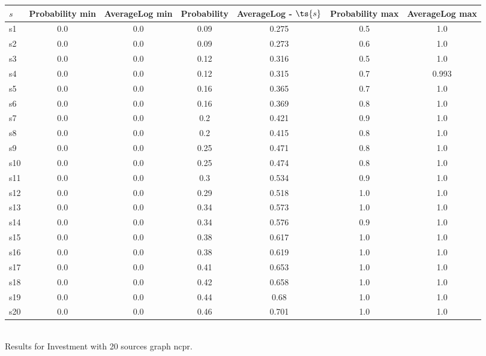 \documentclass{article}
\begin{document}
\noindent\begin{tabular}{|l|c|c|c|c|c|c|}
\hline
$s$& Probability min & AverageLog min & Probability & AverageLog - $\ts{s}$ & Probability max & AverageLog max\\
\hline
s1 &0.0 & 0.0 & 0.09 & 0.275 & 0.5 & 1.0\\
\hline
s2 &0.0 & 0.0 & 0.09 & 0.273 & 0.6 & 1.0\\
\hline
s3 &0.0 & 0.0 & 0.12 & 0.316 & 0.5 & 1.0\\
\hline
s4 &0.0 & 0.0 & 0.12 & 0.315 & 0.7 & 0.993\\
\hline
s5 &0.0 & 0.0 & 0.16 & 0.365 & 0.7 & 1.0\\
\hline
s6 &0.0 & 0.0 & 0.16 & 0.369 & 0.8 & 1.0\\
\hline
s7 &0.0 & 0.0 & 0.2 & 0.421 & 0.9 & 1.0\\
\hline
s8 &0.0 & 0.0 & 0.2 & 0.415 & 0.8 & 1.0\\
\hline
s9 &0.0 & 0.0 & 0.25 & 0.471 & 0.8 & 1.0\\
\hline
s10 &0.0 & 0.0 & 0.25 & 0.474 & 0.8 & 1.0\\
\hline
s11 &0.0 & 0.0 & 0.3 & 0.534 & 0.9 & 1.0\\
\hline
s12 &0.0 & 0.0 & 0.29 & 0.518 & 1.0 & 1.0\\
\hline
s13 &0.0 & 0.0 & 0.34 & 0.573 & 1.0 & 1.0\\
\hline
s14 &0.0 & 0.0 & 0.34 & 0.576 & 0.9 & 1.0\\
\hline
s15 &0.0 & 0.0 & 0.38 & 0.617 & 1.0 & 1.0\\
\hline
s16 &0.0 & 0.0 & 0.38 & 0.619 & 1.0 & 1.0\\
\hline
s17 &0.0 & 0.0 & 0.41 & 0.653 & 1.0 & 1.0\\
\hline
s18 &0.0 & 0.0 & 0.42 & 0.658 & 1.0 & 1.0\\
\hline
s19 &0.0 & 0.0 & 0.44 & 0.68 & 1.0 & 1.0\\
\hline
s20 &0.0 & 0.0 & 0.46 & 0.701 & 1.0 & 1.0\\
\hline
\end{tabular}\\

\noindent Results for Investment with 20 sources graph ncpr.
\end{document}
